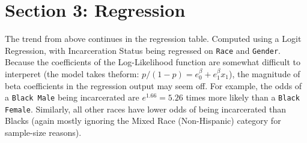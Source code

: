 \documentclass{article}
\begin{document}
\newpage
\section{Section 3: Regression}


The trend from above continues in the regression table. Computed using a Logit Regression, with Incarceration Status being regressed on \texttt{Race} and \texttt{Gender}. Because the coefficients of the Log-Likelihood function are somewhat difficult to interperet (the model takes the\newline form: \(p/(1-p) = e^\beta_0 + e^\beta_1x_1\)), the magnitude of beta coefficients in the regression output may seem off. For example, the odds of a \texttt{Black Male} being incarcerated are $e^1.66 = 5.26$ times more likely than a \texttt{Black Female}. Similarly, all other races have lower odds of being incarcerated than Blacks (again mostly ignoring the Mixed Race (Non-Hispanic) category for sample-size reasons).
\end{document}
